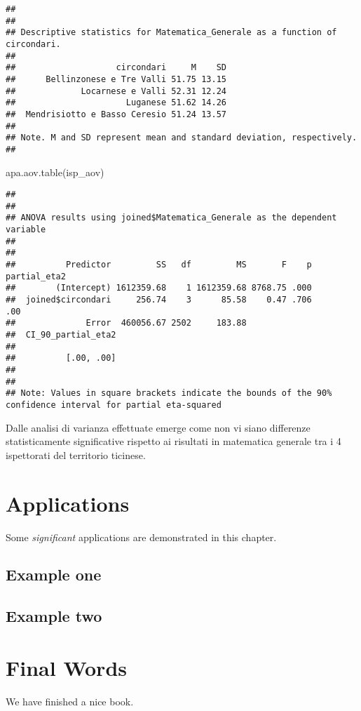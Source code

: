 \documentclass[
]{book}
\newenvironment{Shaded}{\begin{snugshade}}{\end{snugshade}}
\newcommand{\FunctionTok}[1]{\textcolor[rgb]{0.00,0.00,0.00}{#1}}
\newcommand{\NormalTok}[1]{#1}
\begin{document}
\begin{verbatim}
## 
## 
## Descriptive statistics for Matematica_Generale as a function of circondari.  
## 
##                    circondari     M    SD
##      Bellinzonese e Tre Valli 51.75 13.15
##             Locarnese e Valli 52.31 12.24
##                      Luganese 51.62 14.26
##  Mendrisiotto e Basso Ceresio 51.24 13.57
## 
## Note. M and SD represent mean and standard deviation, respectively.
## 
\end{verbatim}

\begin{Shaded}
\begin{Highlighting}[]
\FunctionTok{apa.aov.table}\NormalTok{(isp\_aov)}
\end{Highlighting}
\end{Shaded}

\begin{verbatim}
## 
## 
## ANOVA results using joined$Matematica_Generale as the dependent variable
##  
## 
##          Predictor         SS   df         MS       F    p partial_eta2
##        (Intercept) 1612359.68    1 1612359.68 8768.75 .000             
##  joined$circondari     256.74    3      85.58    0.47 .706          .00
##              Error  460056.67 2502     183.88                          
##  CI_90_partial_eta2
##                    
##          [.00, .00]
##                    
## 
## Note: Values in square brackets indicate the bounds of the 90% confidence interval for partial eta-squared
\end{verbatim}

Dalle analisi di varianza effettuate emerge come non vi siano differenze statisticamente significative rispetto ai risultati in matematica generale tra i 4 ispettorati del territorio ticinese.

\hypertarget{applications}{%
\chapter{Applications}\label{applications}}

Some \emph{significant} applications are demonstrated in this chapter.

\hypertarget{example-one}{%
\section{Example one}\label{example-one}}

\hypertarget{example-two}{%
\section{Example two}\label{example-two}}

\hypertarget{final-words}{%
\chapter{Final Words}\label{final-words}}

We have finished a nice book.

  
\end{document}
